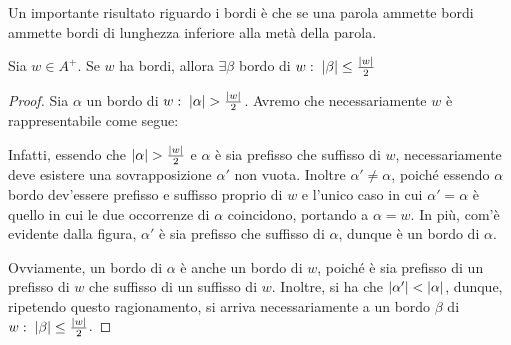 Un importante risultato riguardo i bordi è che se una parola ammette bordi ammette bordi di lunghezza inferiore alla metà della parola.

\begin{proposition}[label=prop:if_border_exists_border_half_length]{}
  Sia \(w \in A^+\). Se \(w\) ha bordi, allora \(\exists \beta\) bordo di \(w :\; \left|\beta\right|\leq\frac{\left|w\right|}{2}\)
\end{proposition}

\begin{proof}
  Sia \(\alpha\) un bordo di \(w :\; \left|\alpha\right| > \frac{\left|w\right|}{2}\).
  Avremo che necessariamente \(w\) è rappresentabile come segue:
  \begin{figure}[H]
    \centering
  \end{figure}
  Infatti, essendo che \(\left|\alpha\right| > \frac{\left|w\right|}{2}\) e \(\alpha\) è sia prefisso che suffisso di \(w\), necessariamente deve esistere una sovrapposizione \(\alpha'\) non vuota.
  Inoltre \(\alpha'\neq\alpha\), poiché essendo \(\alpha\) bordo dev'essere prefisso e suffisso proprio di \(w\) e l'unico caso in cui \(\alpha' = \alpha\) è quello in cui le due occorrenze di \(\alpha\) coincidono, portando a \(\alpha = w\).
  In più, com'è evidente dalla figura, \(\alpha'\) è sia prefisso che suffisso di \(\alpha\), dunque è un bordo di \(\alpha\).

  Ovviamente, un bordo di \(\alpha\) è anche un bordo di \(w\), poiché è sia prefisso di un prefisso di \(w\) che suffisso di un suffisso di \(w\).
  Inoltre, si ha che \(\left|\alpha'\right| < \left|\alpha\right|\), dunque, ripetendo questo ragionamento, si arriva necessariamente a un bordo \(\beta\) di \(w :\; \left|\beta\right| \leq \frac{\left|w\right|}{2}\).
\end{proof}

